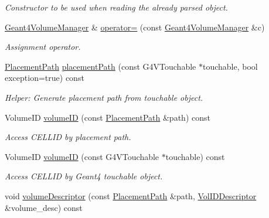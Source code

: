 \begin{DoxyCompactItemize}
\begin{DoxyCompactList}\small\item\em Constructor to be used when reading the already parsed object. \end{DoxyCompactList}\item 
\hyperlink{class_d_d4hep_1_1_simulation_1_1_geant4_volume_manager}{Geant4\+Volume\+Manager} \& \hyperlink{class_d_d4hep_1_1_simulation_1_1_geant4_volume_manager_abe365aa64b701feeb8ee60d4ca4fbb95}{operator=} (const \hyperlink{class_d_d4hep_1_1_simulation_1_1_geant4_volume_manager}{Geant4\+Volume\+Manager} \&c)
\begin{DoxyCompactList}\small\item\em Assignment operator. \end{DoxyCompactList}\item 
\hyperlink{class_d_d4hep_1_1_simulation_1_1_geant4_volume_manager_a990d8577e764541c4914263db1c6b0ca}{Placement\+Path} \hyperlink{class_d_d4hep_1_1_simulation_1_1_geant4_volume_manager_a2501cbbfd58182a5d1c1898f0ca242c2}{placement\+Path} (const G4\+V\+Touchable $\ast$touchable, bool exception=true) const
\begin{DoxyCompactList}\small\item\em Helper\+: Generate placement path from touchable object. \end{DoxyCompactList}\item 
Volume\+ID \hyperlink{class_d_d4hep_1_1_simulation_1_1_geant4_volume_manager_aa23614d7ae201b1e9b9a2f39a3cc5026}{volume\+ID} (const \hyperlink{class_d_d4hep_1_1_simulation_1_1_geant4_volume_manager_a990d8577e764541c4914263db1c6b0ca}{Placement\+Path} \&path) const
\begin{DoxyCompactList}\small\item\em Access C\+E\+L\+L\+ID by placement path. \end{DoxyCompactList}\item 
Volume\+ID \hyperlink{class_d_d4hep_1_1_simulation_1_1_geant4_volume_manager_ace7bf7a749b8bfca537871b3de0bdd38}{volume\+ID} (const G4\+V\+Touchable $\ast$touchable) const
\begin{DoxyCompactList}\small\item\em Access C\+E\+L\+L\+ID by Geant4 touchable object. \end{DoxyCompactList}\item 
void \hyperlink{class_d_d4hep_1_1_simulation_1_1_geant4_volume_manager_af7402b335d1b056c6e55e377adab9d73}{volume\+Descriptor} (const \hyperlink{class_d_d4hep_1_1_simulation_1_1_geant4_volume_manager_a990d8577e764541c4914263db1c6b0ca}{Placement\+Path} \&path, \hyperlink{class_d_d4hep_1_1_simulation_1_1_geant4_volume_manager_aeedd11a516f671331ec2a46f5d39768d}{Vol\+I\+D\+Descriptor} \&volume\+\_\+desc) const

\end{DoxyCompactItemize}
